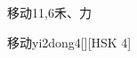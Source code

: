 \begin{entry}{移动}{11,6}{⽲、⼒}
  \begin{phonetics}{移动}{yi2dong4}[][HSK 4]
  \end{phonetics}
\end{entry}
